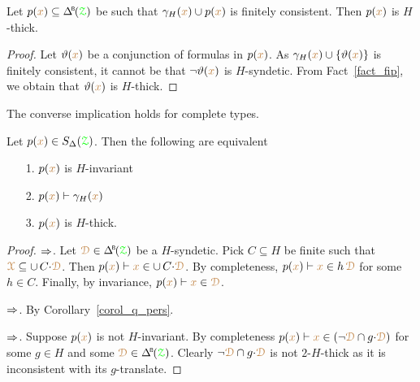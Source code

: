 
\begin{corollary}\label{corol_q_pers}
  Let $p({\mr x})\subseteq\BDelta(\grZ)$ be such that $\gamma_H({\color{brown} x})\cup p({\color{brown} x})$ is finitely consistent.
  Then $p({\color{brown} x})$ is $H$-thick.
\end{corollary}

\begin{proof}
  Let $\vartheta({\color{brown} x})$ be a conjunction of formulas in $p({\color{brown} x})$.
  As $\gamma_H({\color{brown} x})\cup\{\vartheta({\color{brown} x})\}$ is finitely consistent, it cannot be that $\neg\vartheta({\color{brown} x})$ is $H$-syndetic.
  From Fact~\ref{fact_fip}, we obtain that $\vartheta({\color{brown} x})$ is $H$-thick.
\end{proof}

The converse implication holds for complete types.

\begin{theorem}\label{thm_syndetic_invariant}
  Let $p({\color{brown} x})\in S_\Delta({\color{green}\EuScript Z})$.
  Then the following are equivalent
  \begin{itemize}
    \item[1.] $p({\color{brown} x})$ is $H$-invariant
    \item[2.] $p({\color{brown} x})\vdash\gamma_H({\color{brown} x})$
    \item[3.] $p({\color{brown} x})$ is $H$-thick.
  \end{itemize}
\end{theorem}

\begin{proof}
  $\Rightarrow$.
  Let $\mrD\in\BDelta(\grZ)$ be a $H$-syndetic.
  Pick $C\subseteq H$ be finite such that ${\color{brown}\EuScript X}\subseteq\cup\,C{\cdot}{\color{brown}\EuScript D}$.
  Then $p({\color{brown} x})\vdash {\color{brown}x}\in\cup\,C{\cdot}{\color{brown}\EuScript D}$.
  By completeness, $p({\color{brown} x})\vdash {\color{brown}x}\in h\,{\color{brown}\EuScript D}$ for some $h\in C$.
  Finally, by invariance, $p({\color{brown} x})\vdash{\color{brown}x}\in{\color{brown}\EuScript D}$.
  
  $\Rightarrow$.
  By Corollary~\ref{corol_q_pers}.

  $\Rightarrow$.
  Suppose $p({\color{brown} x})$ is not $H$-invariant.
  By completeness $p({\color{brown} x})\vdash{\color{brown}x}\in(\neg{\color{brown}\EuScript D}\cap g{\cdot}{\color{brown}\EuScript D})$ for some $g\in H$ and some $\mrD\in\BDelta(\grZ)$.
  Clearly $\neg{\color{brown}\EuScript D}\cap g{\cdot}{\color{brown}\EuScript D}$ is not $2$-$H$-thick as it is inconsistent with its $g$-translate.
\end{proof}

